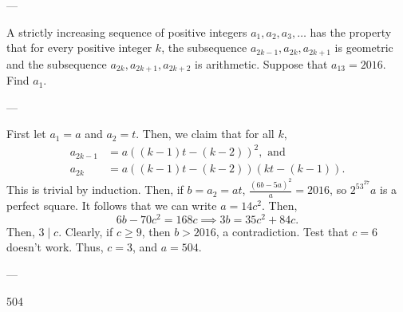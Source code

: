 
---

A strictly increasing sequence of positive integers $a_1, a_2, a_3, \ldots$ has the property that for every positive integer $k$, the subsequence $a_{2k-1}, a_{2k}, a_{2k+1}$ is geometric and the subsequence $a_{2k}, a_{2k+1}, a_{2k+2}$ is arithmetic. Suppose that $a_{13} = 2016$. Find $a_1$.

---

First let $a_1=a$ and $a_2=t$. Then, we claim that for all $k$,
\begin{align*}
    a_{2k-1}&=a((k-1)t-(k-2))^2,\text{ and}\\
    a_{2k}&=a((k-1)t-(k-2))(kt-(k-1)).
\end{align*}
This is trivial by induction. Then, if $b=a_2=at$, $\frac{(6b-5a)^2}a=2016$, so $2^53^27a$ is a perfect square. It follows that we can write $a=14c^2$. Then, $$6b-70c^2=168c\implies 3b=35c^2+84c.$$
Then, $3\mid c$. Clearly, if $c\ge 9$, then $b>2016$, a contradiction. Test that $c=6$ doesn't work. Thus, $c=3$, and $a=504$.

---

504
